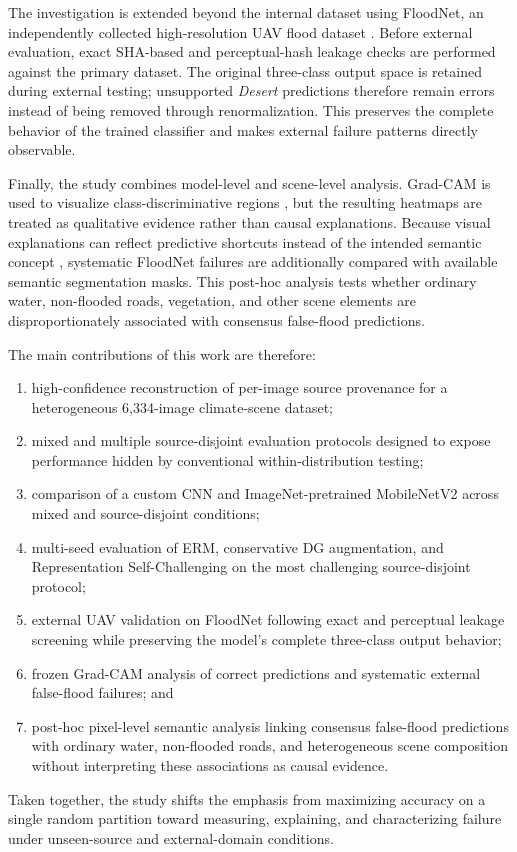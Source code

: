 The investigation is extended beyond the internal dataset using FloodNet, an independently collected high-resolution UAV flood dataset \cite{rahnemoonfar2021floodnet}. Before external evaluation, exact SHA-based and perceptual-hash leakage checks are performed against the primary dataset. The original three-class output space is retained during external testing; unsupported \emph{Desert} predictions therefore remain errors instead of being removed through renormalization. This preserves the complete behavior of the trained classifier and makes external failure patterns directly observable.

Finally, the study combines model-level and scene-level analysis. Grad-CAM is used to visualize class-discriminative regions \cite{selvaraju2017gradcam}, but the resulting heatmaps are treated as qualitative evidence rather than causal explanations. Because visual explanations can reflect predictive shortcuts instead of the intended semantic concept \cite{geirhos2020shortcut,hohl2024xaireview}, systematic FloodNet failures are additionally compared with available semantic segmentation masks. This post-hoc analysis tests whether ordinary water, non-flooded roads, vegetation, and other scene elements are disproportionately associated with consensus false-flood predictions.

The main contributions of this work are therefore:

\begin{enumerate}
    \item high-confidence reconstruction of per-image source provenance for a heterogeneous 6,334-image climate-scene dataset;

    \item mixed and multiple source-disjoint evaluation protocols designed to expose performance hidden by conventional within-distribution testing;

    \item comparison of a custom CNN and ImageNet-pretrained MobileNetV2 across mixed and source-disjoint conditions;

    \item multi-seed evaluation of ERM, conservative DG augmentation, and Representation Self-Challenging on the most challenging source-disjoint protocol;

    \item external UAV validation on FloodNet following exact and perceptual leakage screening while preserving the model's complete three-class output behavior;

    \item frozen Grad-CAM analysis of correct predictions and systematic external false-flood failures; and

    \item post-hoc pixel-level semantic analysis linking consensus false-flood predictions with ordinary water, non-flooded roads, and heterogeneous scene composition without interpreting these associations as causal evidence.
\end{enumerate}

Taken together, the study shifts the emphasis from maximizing accuracy on a single random partition toward measuring, explaining, and characterizing failure under unseen-source and external-domain conditions.
